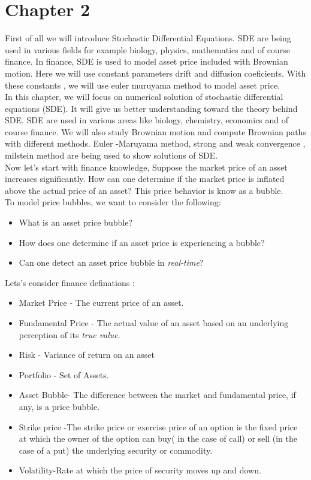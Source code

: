 
\section{Chapter 2}
First of all we will introduce Stochastic Differential Equations. 
 SDE are being used in various fields for example biology, physics, mathematics and of course finance. 
 In finance, SDE is used to model asset price included with Brownian motion. 
 Here we will use constant parameters drift and diffusion coeficients. 
 With these constants , we will use euler muruyama method to model asset price. \\
 In this chapter, we will focus on numerical solution of stochastic differential equations (SDE). It will give us better understanding toward the theory behind SDE. SDE are used in various areas like biology, chemistry, economics and of course finance. We will also study Brownian motion and compute Brownian paths with different methods. Euler -Maruyama method, strong and weak convergence , milstein method are being used to show solutions of SDE. \\
 Now let's start with finance knowledge, Suppose the market price of an asset increases significantly.  How can one determine if the market price is inflated
above the actual price of an asset? This price behavior is know as a bubble.\\
To model price bubbles, we want to consider the following:
\begin{itemize}
\item What is an asset price bubble?
\item How does one determine if an asset price is experiencing a bubble?
\item Can one detect an asset price bubble in \textit{real-time}?
\end{itemize}
Lets's consider finance definations :\\
\begin{itemize}
\item Market Price - The current price of an asset.
\item Fundamental Price - The actual value of an asset based on an underlying perception of its \textit{true value}.
\item Risk - Variance of return on an asset 
\item Portfolio - Set of Assets.

\item Asset Bubble- The difference between the market and fundamental price, if any, is a price bubble.
 
 \item Strike price -The strike price or exercise price of an option is the fixed price at which the owner of the option can buy( in the case of call) or sell (in the case of a put) the underlying security or commodity.

\item Volatility-Rate at which the price of security moves up and down.
\end{itemize} 
